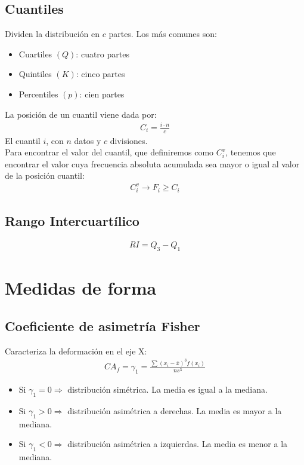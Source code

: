 \documentclass{article}
\begin{document}
\subsection{Cuantiles}
Dividen la distribución en $c$ partes. Los más comunes son:
\begin{itemize}
    \item Cuartiles $(Q)$: cuatro partes
    \item Quintiles $(K)$: cinco partes
    \item Percentiles $(p)$: cien partes
\end{itemize}
La posición de un cuantil viene dada por:
\begin{equation}
    \begin{split}
        C_i= \frac{i \cdot n}{c}
    \end{split}
\end{equation}
El cuantil $i$, con $n$ datos y $c$ divisiones.\\
Para encontrar el valor del cuantil, que definiremos como $C_i^v$, tenemos que encontrar el valor
cuya frecuencia absoluta acumulada sea mayor o igual al valor de la posición cuantil:
\begin{equation}
    \begin{split}
        C_i^v \to F_i \geq C_i
    \end{split}
\end{equation}
\subsection{Rango Intercuartílico}
\begin{equation}
    \begin{split}
        RI=Q_3-Q_1
    \end{split}
\end{equation}
\section{Medidas de forma}
\subsection{Coeficiente de asimetría Fisher}
Caracteriza la deformación en el eje X:
\begin{equation}
    \begin{split}
        CA_f=\gamma_1= \frac{\sum {(x_i-\bar{x})}^3 f(x_{i})}{ns^3}
    \end{split}
\end{equation}
\begin{itemize}
    \item Si $\gamma_1=0\Rightarrow$ distribución simétrica. La media es igual a la mediana. 
    \item Si $\gamma_1>0\Rightarrow$ distribución asimétrica a derechas. La media es mayor a la mediana.
    \item Si $\gamma_1<0\Rightarrow$ distribución asimétrica a izquierdas. La media es menor a la mediana.  
\end{itemize}
\end{document}
